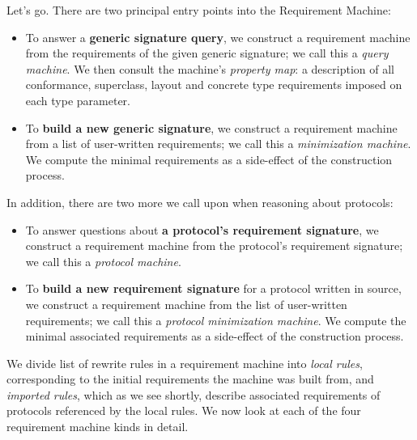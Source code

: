 \documentclass[../generics]{subfiles}
\begin{document}
Let's go. There are two principal entry points into the Requirement Machine:
\begin{itemize}
\item To answer a \textbf{generic signature query}, we construct a requirement machine from the requirements of the given generic signature; we call this a \emph{query machine}. We then consult the machine's \emph{property map}: a description of all conformance, superclass, layout and concrete type requirements imposed on each type parameter.

\item To \textbf{build a new generic signature}, we construct a requirement machine from a list of user-written requirements; we call this a \emph{minimization machine}. We compute the minimal requirements as a side-effect of the construction process.
\end{itemize}
In addition, there are two more we call upon when reasoning about protocols:
\begin{itemize}
\item To answer questions about \textbf{a protocol's requirement signature}, we construct a requirement machine from the protocol's requirement signature; we call this a \emph{protocol machine}.
\item To \textbf{build a new requirement signature} for a protocol written in source, we construct a requirement machine from the list of user-written requirements; we call this a \emph{protocol minimization machine}. We compute the minimal associated requirements as a side-effect of the construction process.
\end{itemize}

We divide list of rewrite rules in a requirement machine into \emph{local rules}, corresponding to the initial requirements the machine was built from, and \emph{imported rules}, which as we see shortly, describe associated requirements of protocols referenced by the local rules. We now look at each of the four requirement machine kinds in detail.
\end{document}

